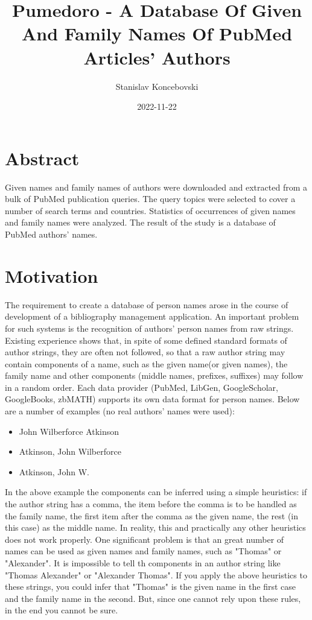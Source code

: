 \documentclass[12pt,a4paper]{article}
\author{Stanislav Koncebovski}
\title{Pumedoro - A Database Of Given And Family Names Of PubMed Articles' Authors}
\date{2022-11-22}
\newcommand{\pmd}{PubMed\xspace}
\newcommand{\gn}{given name\xspace}
\newcommand{\fn}{family name\xspace}
\newcommand{\gns}{given names\xspace}
\newcommand{\fns}{family names\xspace}
\begin{document}
	\maketitle
	
	\section{Abstract}
	Given names and \fns of authors were downloaded and extracted from a bulk of \pmd publication queries. The query topics were selected to cover a number of search terms and countries.
	Statistics of occurrences of \gns and \fns were analyzed. The result of the study is a database of \pmd authors' names.
	
	\section{Motivation}
	The requirement to create a database of person names arose in the course of development of a bibliography management application. An important problem for such systems is the recognition of authors' person names from raw strings. Existing experience shows that, in spite of some defined standard formats of author strings, they are often not followed, so that a raw author string may contain components of a name, such as the \gn (or \gns), the \fn and other components (middle names, prefixes, suffixes) may follow in a random order. Each data provider (\pmd, LibGen, GoogleScholar, GoogleBooks, zbMATH) supports its own data format for person names. Below are a number of examples (no real authors' names were used):
	\begin{itemize}\itemsep-4pt
	\item John Wilberforce Atkinson
	\item Atkinson, John Wilberforce
	\item Atkinson, John W.
	\end{itemize}

	In the above example the components can be inferred using a simple heuristics: if the author string has a comma, the item before the comma is to be handled as the \fn, the first item after the comma as the given name, the rest (in this case) as the middle name. In reality, this and practically any other heuristics does not work properly. One significant problem is that an great number of names can be used as \gns and \fns, such as "Thomas" or "Alexander". It is impossible to tell th components in an author string like "Thomas Alexander" or "Alexander Thomas". If you apply the above heuristics to these strings, you could infer that "Thomas" is the \gn in the first case and the \fn in the second. But, since one cannot rely upon these rules, in the end you cannot be sure.
	
\end{document}
